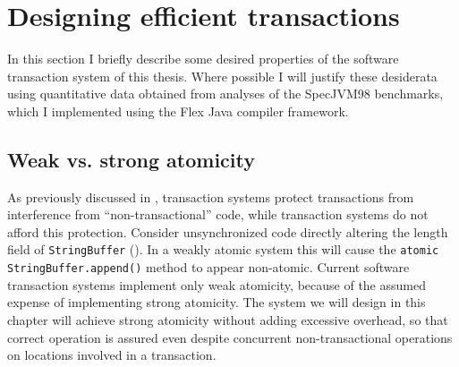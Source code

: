\section{Designing efficient transactions}\label{sec:efficient}

In this section I briefly describe some desired properties of the
software transaction system of this thesis.  Where possible I will
justify these desiderata using quantitative data obtained from
analyses of the SpecJVM98 benchmarks, which I implemented using the
Flex Java compiler framework.

\subsection{Weak vs. strong atomicity}
As previously discussed in ,
transaction systems protect transactions from interference from
``non-transactional'' code, while  transaction
systems do not afford this protection.
Consider unsynchronized code directly altering the length field of
{\tt StringBuffer} ().  In a weakly atomic system
this will cause the {\tt atomic} {\tt StringBuffer.append()} method to
appear non-atomic.  Current software transaction systems implement
only weak atomicity, because of the assumed expense of implementing
strong atomicity.  The system we will design in this chapter will
achieve strong atomicity without adding excessive overhead, so that
correct operation is assured even despite concurrent non-transactional
operations on locations involved in a transaction.


